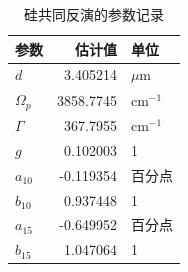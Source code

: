 \begin{table}[htbp]\centering
\caption{硅共同反演的参数记录}\label{tab:si-parameters}
\begin{tabular}{lrl}
\toprule
参数 & 估计值 & 单位\\\midrule
$d$ & 3.405214 & $\mu$m\\
$\Omega_p$ & 3858.7745 & $\mathrm{cm}^{-1}$\\
$\Gamma$ & 367.7955 & $\mathrm{cm}^{-1}$\\
$g$ & 0.102003 & 1\\
$a_{10}$ & -0.119354 & 百分点\\
$b_{10}$ & 0.937448 & 1\\
$a_{15}$ & -0.649952 & 百分点\\
$b_{15}$ & 1.047064 & 1\\
\bottomrule
\end{tabular}\end{table}
